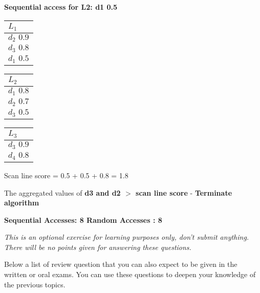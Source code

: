 \textbf{Sequential access for L2: d1 0.5}
 \begin{center}
    \begin{minipage}[t]{2cm}
        \begin{tabular}{|p{25pt}|}\hline
          $L_1$\\\hline
          $d_2 \, \, 0.9$\\\hline
          $d_3 \, \, 0.8$\\\hline
          $d_1 \, \, 0.5$\\\hline
        \end{tabular}
    \end{minipage}
    \hspace{5mm}
    \begin{minipage}[t]{2cm}
        \begin{tabular}{|p{25pt}|}\hline
          $L_2$\\\hline
          $d_1 \, \, 0.8$\\\hline
          $d_2 \, \, 0.7$\\\hline
          $d_3 \, \, 0.5$\\\hline
            \end{tabular}
    \end{minipage}
    \hspace{5mm}
    \begin{minipage}[t]{2cm}
        \begin{tabular}{|p{25pt}|}\hline
        $L_3$\\\hline
        $d_3 \, \, 0.9$\\\hline 
        $d_4 \, \, 0.8$\\\hline
        \end{tabular}
    \end{minipage}
    \end{center}
    
Scan line score = 0.5 + 0.5 + 0.8 = 1.8

The aggregated values of\textbf{ d3 and d2 $>$ scan line score} - \textbf{Terminate algorithm }  

\textbf{Sequential Accesses: 8
Random Accesses : 8}

\newpage
{}
\textit{This is an optional exercise for learning purposes only, don't submit anything. There will be no points given for answering these questions.}

Below a list of review question that you can also expect to be given in the written or oral exams.
You can use these questions to deepen your knowledge of the previous topics.

